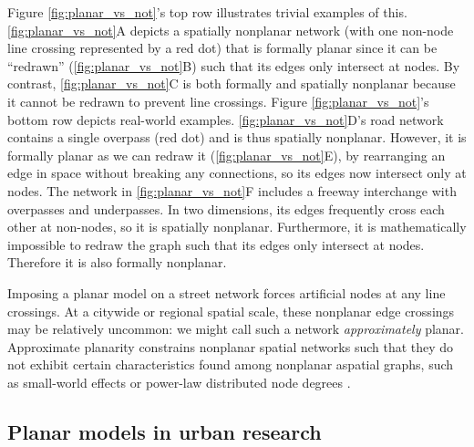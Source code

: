 \documentclass[Afour,doublespace,sageh,times]{sagej}
\begin{document}
Figure \ref{fig:planar_vs_not}'s top row illustrates trivial examples of this. \ref{fig:planar_vs_not}A depicts a spatially nonplanar network (with one non-node line crossing represented by a red dot) that is formally planar since it can be \enquote{redrawn} (\ref{fig:planar_vs_not}B) such that its edges only intersect at nodes. By contrast, \ref{fig:planar_vs_not}C is both formally and spatially nonplanar because it cannot be redrawn to prevent line crossings. Figure \ref{fig:planar_vs_not}'s bottom row depicts real-world examples. \ref{fig:planar_vs_not}D's road network contains a single overpass (red dot) and is thus spatially nonplanar. However, it is formally planar as we can redraw it (\ref{fig:planar_vs_not}E), by rearranging an edge in space without breaking any connections, so its edges now intersect only at nodes. The network in \ref{fig:planar_vs_not}F includes a freeway interchange with overpasses and underpasses. In two dimensions, its edges frequently cross each other at non-nodes, so it is spatially nonplanar. Furthermore, it is mathematically impossible to redraw the graph such that its edges only intersect at nodes. Therefore it is also formally nonplanar.

Imposing a planar model on a street network forces artificial nodes at any line crossings. At a citywide or regional spatial scale, these nonplanar edge crossings may be relatively uncommon: we might call such a network \emph{approximately} planar. Approximate planarity constrains nonplanar spatial networks such that they do not exhibit certain characteristics found among nonplanar aspatial graphs, such as small-world effects or power-law distributed node degrees \citep{crucitti_centrality_2006,fischer_spatial_2014}.

\subsection{Planar models in urban research}
\end{document}

